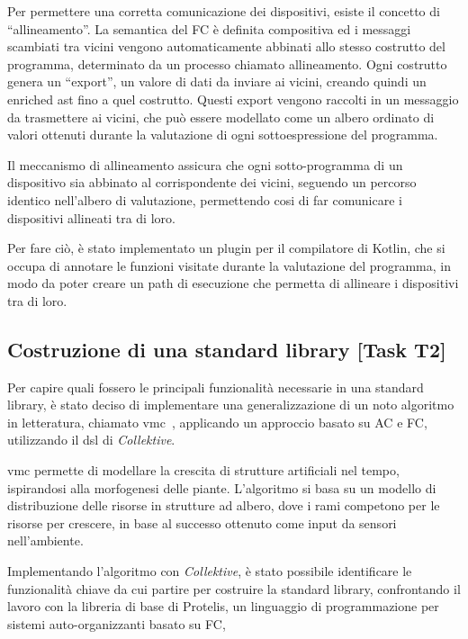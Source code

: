 \documentclass[13pt, a4paper]{scrartcl}
\newcommand{\ck}{\emph{Collektive}}
\begin{document}
Per permettere una corretta comunicazione dei dispositivi, esiste il concetto di ``allineamento''.
%
La semantica del \ac{FC} è definita compositiva ed i messaggi scambiati tra vicini vengono automaticamente abbinati
    allo stesso costrutto del programma, determinato da un processo chiamato allineamento.
%
Ogni costrutto genera un ``export'', un valore di dati da inviare ai vicini, creando quindi un enriched \ac{ast} fino a quel costrutto.
%
Questi export vengono raccolti in un messaggio da trasmettere ai vicini, che può essere modellato come
    un albero ordinato di valori ottenuti durante la valutazione di ogni sottoespressione del programma.

Il meccanismo di allineamento assicura che ogni sotto-programma di un dispositivo sia abbinato al corrispondente dei vicini,
    seguendo un percorso identico nell'albero di valutazione,
    permettendo cosi di far comunicare i dispositivi allineati tra di loro.

Per fare ciò, è stato implementato un plugin per il compilatore di Kotlin, che si occupa di annotare le funzioni visitate
    durante la valutazione del programma, in modo da poter creare un path di esecuzione che permetta di allineare i dispositivi
    tra di loro.

\subsection{Costruzione di una standard library [Task T2]}\label{subsec:task-t2-[costruzione-di-una-standard-library]}

Per capire quali fossero le principali funzionalità necessarie in una standard library,
è stato deciso di implementare una generalizzazione di un noto algoritmo in letteratura, chiamato \ac{vmc}~\cite{ZahadatHS17},
applicando un approccio basato su \ac{AC} e \ac{FC}, utilizzando il \ac{dsl} di \ck{}.

\ac{vmc} permette di modellare la crescita di strutture artificiali nel tempo, ispirandosi alla morfogenesi delle piante.
%
L'algoritmo si basa su un modello di distribuzione delle risorse in strutture ad albero,
    dove i rami competono per le risorse per crescere, in base al successo ottenuto come input da sensori nell'ambiente.

Implementando l'algoritmo con \ck{}, è stato possibile identificare le funzionalità chiave da cui partire per costruire la standard library,
    confrontando il lavoro con la libreria di base di Protelis,
    un linguaggio di programmazione per sistemi auto-organizzanti basato su \ac{FC},
\end{document}
